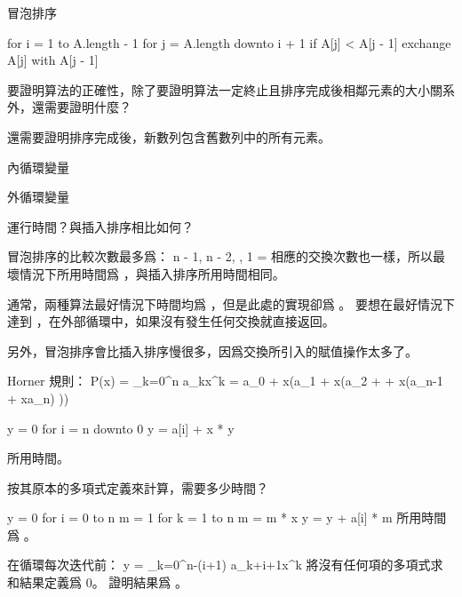 \startPROBLEM
冒泡排序

\startCLRS
for i = 1 to A.length - 1
	for j = A.length downto i + 1
		if A[j] < A[j - 1]
			exchange A[j] with A[j - 1]
\stopCLRS

\startigBase[a]
\item 要證明算法的正確性，除了要證明算法一定終止且排序完成後相鄰元素的大小關系外，還需要證明什麼？
\stopigBase

\startANSWER
還需要證明排序完成後，新數列包含舊數列中的所有元素。
\stopANSWER

\startigBase[continue]
\item 內循環變量
\stopigBase

\startigBase[continue]
\item 外循環變量
\stopigBase

\startigBase[continue]
\item 運行時間？與插入排序相比如何？
\stopigBase

\startANSWER
冒泡排序的比較次數最多爲：
\startformula
n - 1, n - 2, \cdots , 1 = 
\stopformula
相應的交換次數也一樣，所以最壞情況下所用時間爲 ，與插入排序所用時間相同。

通常，兩種算法最好情況下時間均爲 ，但是此處的實現卻爲 。
要想在最好情況下達到 ，在外部循環中，如果沒有發生任何交換就直接返回。

另外，冒泡排序會比插入排序慢很多，因爲交換所引入的賦值操作太多了。
\stopANSWER

\stopPROBLEM

\startPROBLEM
Horner 規則：
\startformula\startalign
\NC P(x) \NC = \sum_{k=0}^n a_kx^k \NR
\NC	\NC = a_0 + x(a_1 + x(a_2 + \cdots + x(a_{n-1} + xa_n) \cdots)) \NR
\stopalign\stopformula

\startCLRS
y = 0
for i = n downto 0
	y = a[i] + x * y
\stopCLRS

\startigBase[a]
\item 所用時間。

\startANSWER
{}
\stopANSWER

\item 按其原本的多項式定義來計算，需要多少時間？

\startANSWER
\startCLRS
y = 0
for i = 0 to n
	m = 1
	for k = 1 to n
		m = m * x
	y = y + a[i] * m
\stopCLRS
所用時間爲 。
\stopANSWER

\item 在循環每次迭代前：
\startformula
y = \sum_{k=0}^{n-(i+1)} a_{k+i+1}x^k
\stopformula
將沒有任何項的多項式求和結果定義爲 0。
證明結果爲 。

